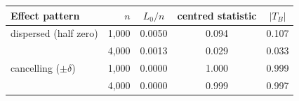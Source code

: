 \begin{tabular}{lrccc}
\toprule
Effect pattern & $n$ & $L_0/n$ & centred statistic & $|T_B|$ \\
\midrule
dispersed (half zero) & 1,000 & 0.0050 & 0.094 & 0.107 \\
 & 4,000 & 0.0013 & 0.029 & 0.033 \\
cancelling ($\pm\delta$) & 1,000 & 0.0000 & 1.000 & 0.999 \\
 & 4,000 & 0.0000 & 0.999 & 0.997 \\
\bottomrule
\end{tabular}
